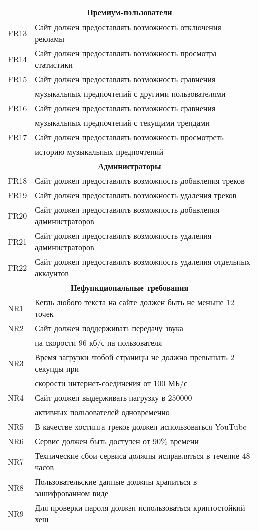 \begin{longtable}{|l|l|}
    \hline \multicolumn{2}{|c|}{\textbf{Премиум-пользователи}} \\
    \hline FR13 & Сайт должен предоставлять возможность отключения рекламы \\
    \hline FR14 & Сайт должен предоставлять возможность просмотра статистики \\
    \hline FR15 & Сайт должен предоставлять возможность сравнения \\
                & музыкальных предпочтений с другими пользователями \\
    \hline FR16 & Сайт должен предоставлять возможность сравнения \\
                & музыкальных предпочтений с текущими трендами \\
    \hline FR17 & Сайт должен предоставлять возможность просмотреть \\
                & историю музыкальных предпочтений \\

    \hline \multicolumn{2}{|c|}{\textbf{Администраторы}} \\
    \hline FR18 & Сайт должен предоставлять возможность добавления треков \\
    \hline FR19 & Сайт должен предоставлять возможность удаления треков \\
    \hline FR20 & Сайт должен предоставлять возможность добавления администраторов \\
    \hline FR21 & Сайт должен предоставлять возможность удаления администраторов \\
    \hline FR22 & Сайт должен предоставлять возможность удаления отдельных аккаунтов \\

    \hline \multicolumn{2}{|c|}{\textbf{Нефункциональные требования}} \\
    \hline NR1 & Кегль любого текста на сайте должен быть не меньше $12$ точек \\
    \hline NR2 & Сайт должен поддерживать передачу звука \\
               & на скорости $96$ кб/с на пользователя \\
    \hline NR3 & Время загрузки любой страницы не должно превышать $2$ секунды при \\
               & скорости интернет-соединения от $100$ МБ/с \\
    \hline NR4 & Сайт должен выдерживать нагрузку в $250 000$ \\
               & активных пользователей одновременно \\
    \hline NR5 & В качестве хостинга треков должен использоваться YouTube \\
    \hline NR6 & Сервис должен быть доступен от $90\%$ времени \\
    \hline NR7 & Технические сбои сервиса должны исправляться в течение $48$ часов \\
    \hline NR8 & Пользовательские данные должны храниться в зашифрованном виде \\
    \hline NR9 & Для проверки пароля должен использоваться криптостойкий хеш \\
    \hline
\end{longtable}

